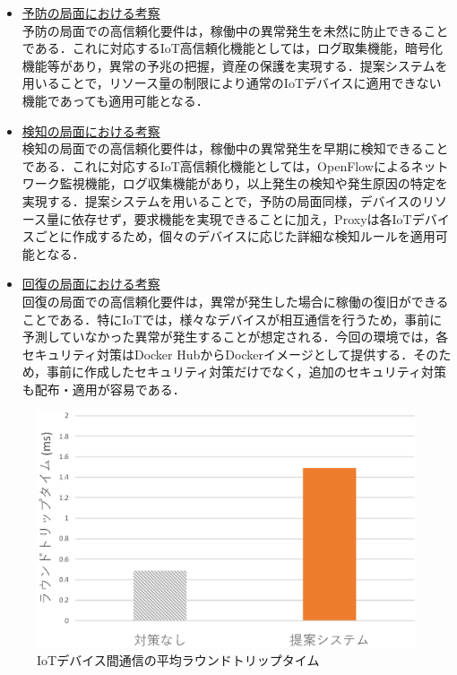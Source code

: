 \documentclass[Japanese]{dicomopapers}
\begin{document}
\begin{itemize}
	\item \underline{予防の局面における考察}\mbox{}\\
	      予防の局面での高信頼化要件は，稼働中の異常発生を未然に防止できることである．これに対応するIoT高信頼化機能としては，ログ取集機能，暗号化機能等があり，異常の予兆の把握，資産の保護を実現する．提案システムを用いることで，リソース量の制限により通常のIoTデバイスに適用できない機能であっても適用可能となる．
	\item \underline{検知の局面における考察}\mbox{}\\
	      検知の局面での高信頼化要件は，稼働中の異常発生を早期に検知できることである．これに対応するIoT高信頼化機能としては，OpenFlowによるネットワーク監視機能，ログ収集機能があり，以上発生の検知や発生原因の特定を実現する．提案システムを用いることで，予防の局面同様，デバイスのリソース量に依存せず，要求機能を実現できることに加え，Proxyは各IoTデバイスごとに作成するため，個々のデバイスに応じた詳細な検知ルールを適用可能となる．
	\item \underline{回復の局面における考察}\mbox{}\\
	      回復の局面での高信頼化要件は，異常が発生した場合に稼働の復旧ができることである．特にIoTでは，様々なデバイスが相互通信を行うため，事前に予測していなかった異常が発生することが想定される．今回の環境では，各セキュリティ対策はDocker HubからDockerイメージとして提供する．そのため，事前に作成したセキュリティ対策だけでなく，追加のセキュリティ対策も配布・適用が容易である．
\end{itemize}

\begin{figure}[!tb]
	\centering
	\includegraphics[width=\linewidth]{img/result.eps}
	\caption{IoTデバイス間通信の平均ラウンドトリップタイム}
	\label{fig:result2}
\end{figure}
\end{document}
